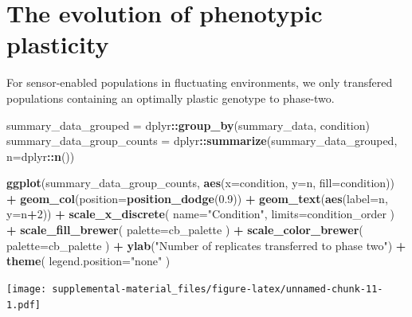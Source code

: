 \documentclass[]{book}
\newenvironment{Shaded}{\begin{snugshade}}{\end{snugshade}}
\newcommand{\DataTypeTok}[1]{\textcolor[rgb]{0.13,0.29,0.53}{#1}}
\newcommand{\DecValTok}[1]{\textcolor[rgb]{0.00,0.00,0.81}{#1}}
\newcommand{\FloatTok}[1]{\textcolor[rgb]{0.00,0.00,0.81}{#1}}
\newcommand{\KeywordTok}[1]{\textcolor[rgb]{0.13,0.29,0.53}{\textbf{#1}}}
\newcommand{\NormalTok}[1]{#1}
\newcommand{\OperatorTok}[1]{\textcolor[rgb]{0.81,0.36,0.00}{\textbf{#1}}}
\newcommand{\StringTok}[1]{\textcolor[rgb]{0.31,0.60,0.02}{#1}}
\begin{document}
\hypertarget{the-evolution-of-phenotypic-plasticity}{%
\section{The evolution of phenotypic plasticity}\label{the-evolution-of-phenotypic-plasticity}}

For sensor-enabled populations in fluctuating environments, we only transfered populations containing an optimally plastic genotype to phase-two.

\begin{Shaded}
\begin{Highlighting}[]
\NormalTok{summary_data_grouped =}\StringTok{ }\NormalTok{dplyr}\OperatorTok{::}\KeywordTok{group_by}\NormalTok{(summary_data, condition)}
\NormalTok{summary_data_group_counts =}\StringTok{ }\NormalTok{dplyr}\OperatorTok{::}\KeywordTok{summarize}\NormalTok{(summary_data_grouped, }\DataTypeTok{n=}\NormalTok{dplyr}\OperatorTok{::}\KeywordTok{n}\NormalTok{())}

\KeywordTok{ggplot}\NormalTok{(summary_data_group_counts, }\KeywordTok{aes}\NormalTok{(}\DataTypeTok{x=}\NormalTok{condition, }\DataTypeTok{y=}\NormalTok{n, }\DataTypeTok{fill=}\NormalTok{condition)) }\OperatorTok{+}
\StringTok{  }\KeywordTok{geom_col}\NormalTok{(}\DataTypeTok{position=}\KeywordTok{position_dodge}\NormalTok{(}\FloatTok{0.9}\NormalTok{)) }\OperatorTok{+}
\StringTok{  }\KeywordTok{geom_text}\NormalTok{(}\KeywordTok{aes}\NormalTok{(}\DataTypeTok{label=}\NormalTok{n, }\DataTypeTok{y=}\NormalTok{n}\OperatorTok{+}\DecValTok{2}\NormalTok{)) }\OperatorTok{+}
\StringTok{  }\KeywordTok{scale_x_discrete}\NormalTok{(}
    \DataTypeTok{name=}\StringTok{"Condition"}\NormalTok{,}
    \DataTypeTok{limits=}\NormalTok{condition_order}
\NormalTok{  ) }\OperatorTok{+}
\StringTok{  }\KeywordTok{scale_fill_brewer}\NormalTok{(}
    \DataTypeTok{palette=}\NormalTok{cb_palette}
\NormalTok{  ) }\OperatorTok{+}
\StringTok{  }\KeywordTok{scale_color_brewer}\NormalTok{(}
    \DataTypeTok{palette=}\NormalTok{cb_palette}
\NormalTok{  ) }\OperatorTok{+}
\StringTok{  }\KeywordTok{ylab}\NormalTok{(}\StringTok{"Number of replicates transferred to phase two"}\NormalTok{) }\OperatorTok{+}
\StringTok{  }\KeywordTok{theme}\NormalTok{(}
    \DataTypeTok{legend.position=}\StringTok{"none"}
\NormalTok{  )}
\end{Highlighting}
\end{Shaded}

\texttt{[image: supplemental-material\_files/figure-latex/unnamed-chunk-11-1.pdf]}
\end{document}
